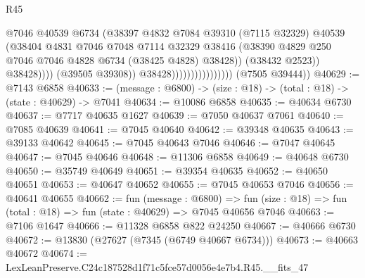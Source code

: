 \begin{lexlean}{R45}
\begin{coremodule}
{                                                @7046
                                                @40539
                                                @6734
                                                (@38397
                                                  @4832
                                                  @7084
                                                  @39310
                                                  (@7115 @32329)
                                                  @40539
                                                  (@38404
                                                    @4831
                                                    @7046
                                                    @7048
                                                    @7114
                                                    @32329
                                                    @38416
                                                    (@38390
                                                      @4829
                                                      @250
                                                      @7046
                                                      @7046
                                                      @4828
                                                      @6734
                                                      (@38425 @4828)
                                                      @38428))
                                                  (@38432 @2523))
                                                @38428))))
                                        (@39505 @39308))
                                      @38428))))))))))))))))
      (@7505 @39444))
@40629 := @7143 @6858
@40633 := (message : @6800) -> (size : @18) -> (total : @18) -> (state : @40629) -> @7041
@40634 := @10086 @6858
@40635 := @40634 @6730
@40637 := @7717 @40635 @1627
@40639 := @7050 @40637 @7061
@40640 := @7085 @40639
@40641 := @7045 @40640
@40642 := @39348 @40635
@40643 := @39133 @40642
@40645 := @7045 @40643 @7046
@40646 := @7047 @40645
@40647 := @7045 @40646
@40648 := @11306 @6858
@40649 := @40648 @6730
@40650 := @35749 @40649
@40651 := @39354 @40635
@40652 := @40650 @40651
@40653 := @40647 @40652
@40655 := @7045 @40653 @7046
@40656 := @40641 @40655
@40662 := fun (message : @6800) =>
  fun (size : @18) => fun (total : @18) => fun (state : @40629) => @7045 @40656 @7046
@40663 := @7106 @1647
@40666 := @11328 @6858 @822 @24250
@40667 := @40666 @6730
@40672 := @13830 (@27627 (@7345 (@6749 @40667 @6734)))
@40673 := @40663 @40672
@40674 := LexLeanPreserve.C24c187528d1f71c5fce57d0056e4e7b4.R45.__fits_47
}
\end{coremodule}
\end{lexlean}
